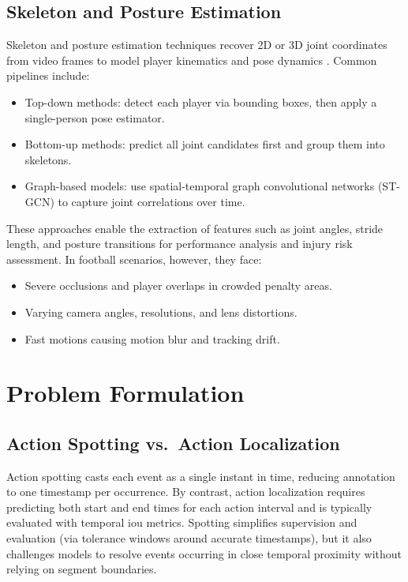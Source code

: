 \subsection{Skeleton and Posture Estimation}
\label{ssec:skeleton_posture_estimation}

Skeleton and posture estimation techniques recover 2D or 3D joint coordinates from video frames to model player kinematics and pose dynamics \cite{elaoud_skeleton-based_2020, wang_skeleton_two-stream_2023, reilly__skeleton_just_pi_2023}. Common pipelines include:
\begin{itemize}
    \item Top-down methods: detect each player via bounding boxes, then apply a single-person pose estimator.
    \item Bottom-up methods: predict all joint candidates first and group them into skeletons.
    \item Graph-based models: use spatial-temporal graph convolutional networks (ST-GCN) to capture joint correlations over time\cite{yan_spatial_temporal_graph_convolutional_2018}.
\end{itemize}
These approaches enable the extraction of features such as joint angles, stride length, and posture transitions for performance analysis and injury risk assessment. In football scenarios, however, they face:
\begin{itemize}
    \item Severe occlusions and player overlaps in crowded penalty areas.
    \item Varying camera angles, resolutions, and lens distortions.
    \item Fast motions causing motion blur and tracking drift\cite{survey_of_survey}.
\end{itemize} 


\section{Problem Formulation}
\label{sec:problem_formulation}

\subsection{Action Spotting vs.\ Action Localization}
Action spotting casts each event as a single instant in time, reducing annotation to one timestamp per occurrence. By contrast, action localization requires predicting both start and end times for each action interval and is typically evaluated with temporal \acrfull{iou} metrics. Spotting simplifies supervision and evaluation (via tolerance windows around accurate timestamps), but it also challenges models to resolve events occurring in close temporal proximity without relying on segment boundaries.

